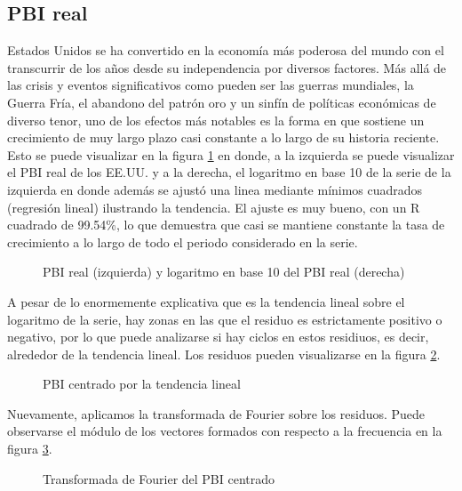 \documentclass[a4paper]{article}
\begin{document}
\subsection{PBI real}
Estados Unidos se ha convertido en la economía más poderosa del mundo con el transcurrir de los años desde su independencia por diversos factores. Más allá de las crisis y eventos significativos como pueden ser las guerras mundiales, la Guerra Fría, el abandono del patrón oro y un sinfín de políticas económicas de diverso tenor, uno de los efectos más notables es la forma en que sostiene un crecimiento de muy largo plazo casi constante a lo largo de su historia reciente. Esto se puede visualizar en la figura \ref{fig:PBI_orig} en donde, a la izquierda se puede visualizar el PBI real de los EE.UU. y a la derecha, el logaritmo en base 10 de la serie de la izquierda en donde además se ajustó una linea mediante mínimos cuadrados (regresión lineal) ilustrando la tendencia. El ajuste es muy bueno, con un R cuadrado de 99.54\%, lo que demuestra que casi se mantiene constante la tasa de crecimiento a lo largo de todo el periodo considerado en la serie.

\begin{figure}[H]
	\centering
	\caption{PBI real (izquierda) y logaritmo en base 10 del PBI real (derecha)} 	
	\label{fig:PBI_orig}
\end{figure}

A pesar de lo enormemente explicativa que es la tendencia lineal sobre el logaritmo de la serie, hay zonas en las que el residuo es estrictamente positivo o negativo, por lo que puede analizarse si hay ciclos en estos residiuos, es decir, alrededor de la tendencia lineal. Los residuos pueden visualizarse en la figura \ref{fig:PBI_cntr}.

\begin{figure}[H]
	\centering
	\caption{PBI centrado por la tendencia lineal} 	
	\label{fig:PBI_cntr}
\end{figure}


Nuevamente, aplicamos la transformada de Fourier sobre los residuos. Puede observarse el módulo de los vectores formados con respecto a la frecuencia en la figura \ref{fig:PBI_cntr_fft}.

\begin{figure}[H]
	\centering
	\caption{Transformada de Fourier del PBI centrado} 	
	\label{fig:PBI_cntr_fft}
\end{figure}
\end{document}
